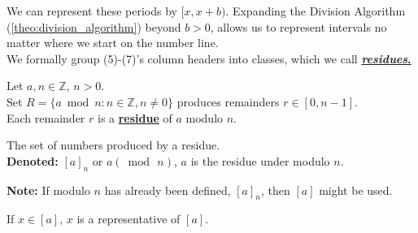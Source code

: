 \noindent
We can represent these periods by $[x, x+b)$. Expanding the Division Algorithm (\ref{theo:division_algorithm}) beyond $b>0$, allows us to
represent intervals no matter where we start on the number line.\\

\noindent
We formally group (5)-(7)'s column headers into classes, which we call \underline{\textbf{\textit{residues}.}}

\newpage

\begin{Def}[Residue]

    \label{def:residue}

    Let $a,n\in\mathbb{Z}$, $n>0$.\\

    \noindent
    Set $R=\{a\bmod n: n\in\mathbb{Z}, n\neq0\}$ produces remainders $r\in[0,n-1]$.\\
    Each remainder $r$ is a \underline{\textbf{residue}} of $a$ modulo $n$.
\end{Def}

\begin{Def}

    \label{def:residue_class}

    The set of numbers produced by a residue.\\

    \noindent
    \textbf{Denoted:} $[a]_n$ or $a (\bmod\, n)$, $a$ is the residue under modulo $n$.
\end{Def}
\begin{Note}
    \textbf{Note:} If modulo $n$ has already been defined, $[a]_n$, then $[a]$ might be used.
\end{Note}
\begin{Def}[Representative]

    \label{def:representative}

    If $x\in [a]$, $x$ is a representative of $[a]$.
\end{Def}





